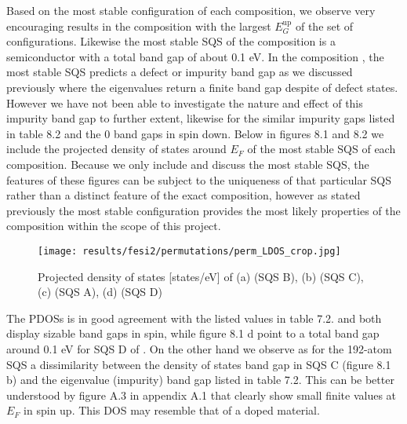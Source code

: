 Based on the most stable configuration of each composition, we observe very encouraging results in the  composition with the largest $E_G ^\text{up}$ of the set of configurations. Likewise the most stable SQS of the  composition is a semiconductor with a total band gap of about 0.1 eV. In the composition , the most stable SQS predicts a defect or impurity band gap as we discussed previously where the eigenvalues return a finite band gap despite of defect states. However we have not been able to investigate the nature and effect of this impurity band gap to further extent, likewise for the similar impurity gaps listed in table 8.2 and the 0 band gaps in spin down. Below in figures 8.1 and 8.2 we include the projected density of states around $E_F$ of the most stable SQS of each composition. Because we only include and discuss the most stable SQS, the features of these figures can be subject to the uniqueness of that particular SQS rather than a distinct feature of the exact composition, however as stated previously the most stable configuration provides the most likely properties of the composition within the scope of this project. 

\begin{figure}[H]
\texttt{[image: results/fesi2/permutations/perm\_LDOS\_crop.jpg]}
\caption{Projected density of states [states/eV] of (a)  (SQS B), (b)  (SQS C), (c)  (SQS A), (d)  (SQS D)}
\end{figure}

The PDOSs is in good agreement with the listed values in table 7.2.   and  both display sizable band gaps in spin, while figure 8.1 d point to a total band gap around 0.1 eV for SQS D of . On the other hand we observe as for the 192-atom SQS a dissimilarity between the density of states band gap in  SQS C (figure 8.1 b) and the eigenvalue (impurity) band gap listed in table 7.2. This can be better understood by figure A.3 in appendix A.1 that clearly show small finite values at $E_F$ in spin up. This DOS may resemble that of a doped material.    



